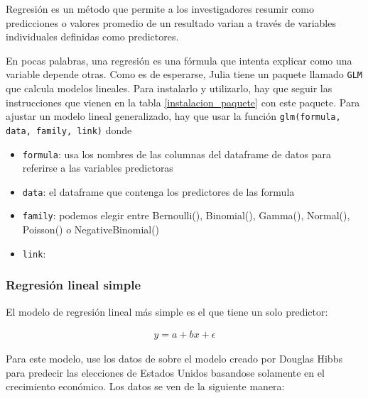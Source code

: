 Regresión es un método que permite a los investigadores resumir como predicciones o valores promedio de un resultado varian a través de variables individuales definidas como predictores. \citep{regression_other_stories} 

En pocas palabras, una regresión es una fórmula que intenta explicar como una variable depende otras. Como es de esperarse, Julia tiene un paquete llamado \texttt{GLM} que calcula modelos lineales. Para instalarlo y utilizarlo, hay que seguir las instrucciones que vienen en la tabla \ref{instalacion_paquete} con este paquete. Para ajustar un modelo lineal generalizado, hay que usar la función \texttt{glm(formula, data, family, link)} donde 

\begin{itemize}
    \item \texttt{formula}: usa los nombres de las columnas del dataframe de datos para referirse a las variables predictoras
    \item \texttt{data}: el dataframe que contenga los predictores de las formula
    \item \texttt{family}: podemos elegir entre Bernoulli(), Binomial(), Gamma(), Normal(), Poisson() o NegativeBinomial() 
    \item \texttt{link}: 
\end{itemize}


\subsubsection{Regresión lineal simple}
El modelo de regresión lineal más simple es el que tiene un solo predictor: 

\begin{equation}
    \begin{aligned}
    y = a + bx + \epsilon
    \end{aligned}
\end{equation}

Para este modelo, use los datos de \citep{regression_other_stories} sobre el modelo creado por Douglas Hibbs para predecir las elecciones de Estados Unidos basandose solamente en el crecimiento económico. Los datos se ven de la siguiente manera: 

